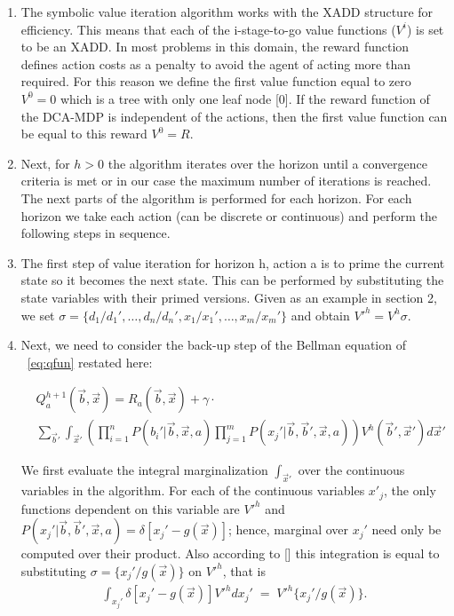 \documentclass[letterpaper]{article}
\renewcommand{\-}{\text{-}}
\begin{document}
\begin{enumerate}
\item The symbolic value iteration algorithm works with the XADD structure for efficiency. This means that each of the i-stage-to-go value functions ($V^i$) is set to be an XADD. In most problems in this domain, the reward function defines action costs as a penalty to avoid the agent of acting more than required. For this reason we define the first value function equal to zero $V^0=0$ which is a tree with only one leaf node [0]. If the reward function of the DCA-MDP is independent of the actions, then the first value function can be equal to this reward $V^0=R$.\\

\item Next, for $h > 0$ the algorithm iterates over the horizon until a convergence criteria is met or in our case the maximum number of iterations is reached. The next parts of the algorithm is performed for each horizon. For each horizon we take each action (can be discrete or continuous) and perform the following steps in sequence.\\

\item The first step of value iteration for horizon h, action a is to prime the current state so it becomes the next state. This can be performed by substituting the state variables with their primed versions. Given as an example in section 2, we set
$\sigma = \{ d_1 / d_1', \ldots, d_n / d_n', x_1 / x_1', \ldots, x_m / x_m' \}$
and obtain $V'^{h} = V^{h}\sigma$.

\item Next, we need to consider the back-up step of the Bellman equation of ~\eqref{eq:qfun} restated here: 
 \vspace{-3mm}
 
 {\footnotesize
 \begin{align}
 & Q_a^{h+1}(\vec{b},\vec{x}) = R_a(\vec{b},\vec{x}) + \gamma \cdot \label{eq:qfun} \\ 
 & \sum_{\vec{b}'} \int_{\vec{x}'} \left( \prod_{i=1}^n P(b_i'|\vec{b},\vec{x},a) \prod_{j=1}^m P(x_j'|\vec{b},\vec{b}',\vec{x},a) \right) V^h(\vec{b}',\vec{x}') d\vec{x}' \nonumber
 \end{align}}
 
We first evaluate the integral marginalization $\int_{\vec{x}'}$ over the continuous variables in the algorithm. For each of the continuous variables $x'_j$, the only functions dependent on this variable are $V'^{h}$
and $P(x_j'|\vec{b},\vec{b}',\vec{x},a) = \delta[x_j' - g(\vec{x})]$; 
hence, marginal over $x_j'$ need only be computed over
their product. Also according to [] this integration is equal to substituting $\sigma = \{ x_j' / g(\vec{x}) \}$
on $V'^{h}$, that is
\begin{align}
\int_{x_j'} \delta[x_j' - g(\vec{x})] V'^{h} dx_j' \; = \; V'^{h} \{x_j' / g(\vec{x}) \} . \label{eq:one_int}
\end{align}


\end{enumerate}
\end{document}
